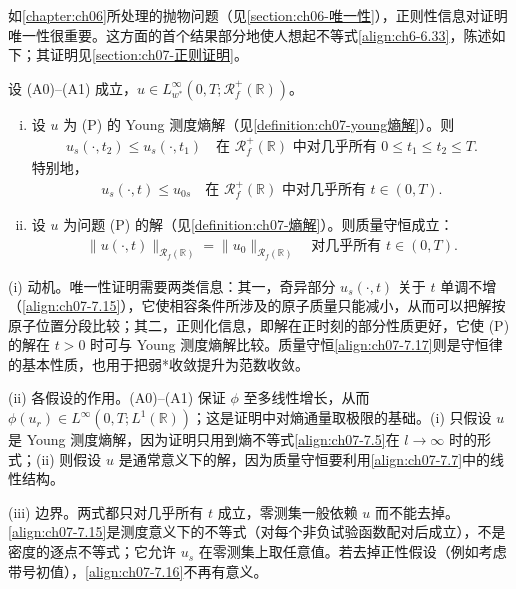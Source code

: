 ﻿\documentclass[../../main.tex]{subfiles}%
\begin{document}
如\cref{chapter:ch06}所处理的抛物问题（见\cref{section:ch06-唯一性}），正则性信息对证明唯一性很重要。这方面的首个结果部分地使人想起不等式\eqref{align:ch6-6.33}，陈述如下；其证明见\cref{section:ch07-正则证明}。

\begin{proposition}\label{proposition:ch07-7.1.2}
设 (A0)--(A1) 成立，$u\in L^\infty_{w^*}(0,T;\mathscr{R}_f^+(\mathbb{R}))$。
\begin{enumerate}[(i)]
\item 设 $u$ 为 (P) 的 Young 测度熵解（见\cref{definition:ch07-young熵解}）。则
\begin{align}
u_s(\cdot,t_2)\leqslant u_s(\cdot,t_1)\quad\text{在 }\mathscr{R}_f^+(\mathbb{R})\text{ 中对几乎所有 }0\leqslant t_1\leqslant t_2\leqslant T. \label{align:ch07-7.15}
\end{align}
特别地，
\begin{align}
u_s(\cdot,t)\leqslant u_{0s}\quad\text{在 }\mathscr{R}_f^+(\mathbb{R})\text{ 中对几乎所有 }t\in(0,T). \label{align:ch07-7.16}
\end{align}
\item 设 $u$ 为问题 (P) 的解（见\cref{definition:ch07-熵解}）。则质量守恒成立：
\begin{align}
\|u(\cdot,t)\|_{\mathscr{R}_f(\mathbb{R})}=\|u_0\|_{\mathscr{R}_f(\mathbb{R})}
\quad\text{对几乎所有 }t\in(0,T). \label{align:ch07-7.17}
\end{align}
\end{enumerate}
\end{proposition}

\begin{remark}\label{remark:ch07-7.1.2动机}
(i) 动机。唯一性证明需要两类信息：其一，奇异部分 $u_s(\cdot,t)$ 关于 $t$ 单调不增（\eqref{align:ch07-7.15}），它使相容条件所涉及的原子质量只能减小，从而可以把解按原子位置分段比较；其二，正则化信息，即解在正时刻的部分性质更好，它使 (P) 的解在 $t>0$ 时可与 Young 测度熵解比较。质量守恒\eqref{align:ch07-7.17}则是守恒律的基本性质，也用于把弱*收敛提升为范数收敛。

(ii) 各假设的作用。(A0)--(A1) 保证 $\phi$ 至多线性增长，从而 $\phi(u_r)\in L^\infty(0,T;L^1(\mathbb{R}))$；这是证明中对熵通量取极限的基础。(i) 只假设 $u$ 是 Young 测度熵解，因为证明只用到熵不等式\eqref{align:ch07-7.5}在 $l\to\infty$ 时的形式；(ii) 则假设 $u$ 是通常意义下的解，因为质量守恒要利用\eqref{align:ch07-7.7}中的线性结构。

(iii) 边界。两式都只对几乎所有 $t$ 成立，零测集一般依赖 $u$ 而不能去掉。\eqref{align:ch07-7.15}是测度意义下的不等式（对每个非负试验函数配对后成立），不是密度的逐点不等式；它允许 $u_s$ 在零测集上取任意值。若去掉正性假设（例如考虑带号初值），\eqref{align:ch07-7.16}不再有意义。
\end{remark}
\end{document}
